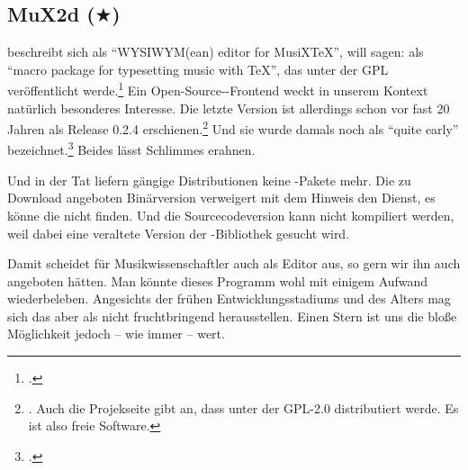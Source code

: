 %
%
%



\subsection{MuX2d ($\bigstar$)}

\label{MuX2d} beschreibt sich als \enquote{WYSIWYM(ean) editor for
MusiXTeX}, will sagen: als \enquote{macro package for typesetting music with
TeX}, das unter der GPL veröffentlicht werde.\footcite[vgl.][\nopage
wp]{Mux2d2000a} Ein Open-Source--Frontend weckt in unserem
Kontext natürlich besonderes Interesse. Die letzte Version ist allerdings schon
vor fast 20 Jahren als Release 0.2.4 erschienen.\footnote{\cite[vgl.][\nopage
wp]{Mux2d2000b}. Auch die Projekseite gibt an, dass  unter der GPL-2.0
distributiert werde. Es ist also freie Software.} Und sie wurde damals noch als
\enquote{quite early} bezeichnet.\footcite[vgl.][\nopage wp]{Mux2d2000a} Beides
lässt Schlimmes erahnen.

Und in der Tat liefern gängige Distributionen keine -Pakete mehr. Die
zu Download angeboten Binärversion verweigert mit dem Hinweis den Dienst, es
könne die  nicht finden. Und die Sourcecodeversion kann nicht
kompiliert werden, weil dabei eine veraltete Version der -Bibliothek
gesucht wird.

Damit scheidet für Musikwissenschaftler auch  als Editor aus, so gern
wir ihn auch angeboten hätten. Man könnte dieses Programm wohl mit einigem
Aufwand wiederbeleben. Angesichts der frühen Entwicklungsstadiums und des Alters
mag sich das aber als nicht fruchtbringend herausstellen. Einen Stern ist uns
die bloße Möglichkeit jedoch -- wie immer -- wert.
%
